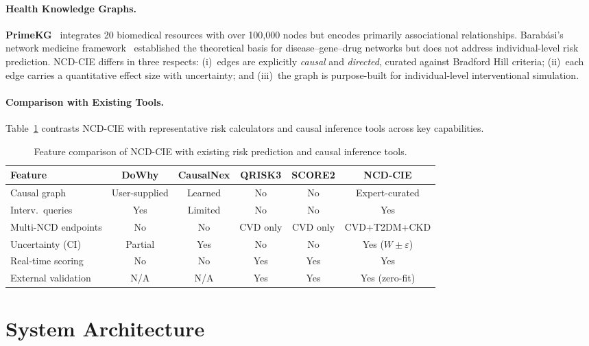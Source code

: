 \documentclass[runningheads]{llncs}
\begin{document}
\paragraph{Health Knowledge Graphs.}
\textbf{PrimeKG}~\cite{chandak2023primekg} integrates 20 biomedical
resources with over 100{,}000 nodes but encodes primarily
associational relationships.  Barab\'{a}si's network medicine
framework~\cite{barabasi2011network} established the theoretical
basis for disease--gene--drug networks but does not address
individual-level risk prediction.  NCD-CIE differs in three respects:
(i)~edges are explicitly \emph{causal} and \emph{directed}, curated
against Bradford Hill criteria; (ii)~each edge carries a quantitative
effect size with uncertainty; and (iii)~the graph is purpose-built for
individual-level interventional simulation.

\paragraph{Comparison with Existing Tools.}
Table~\ref{tab:toolcomp} contrasts NCD-CIE with representative risk
calculators and causal inference tools across key capabilities.

\begin{table}[t]
\centering
\caption{Feature comparison of NCD-CIE with existing risk prediction
and causal inference tools.}\label{tab:toolcomp}
\small
\begin{tabular}{@{}lccccc@{}}
\toprule
\textbf{Feature} & \textbf{DoWhy} & \textbf{CausalNex} &
\textbf{QRISK3} & \textbf{SCORE2} & \textbf{NCD-CIE} \\
\midrule
Causal graph        & User-supplied & Learned & No  & No  & Expert-curated \\
Interv.\ queries    & Yes & Limited & No  & No  & Yes \\
Multi-NCD endpoints & No  & No      & CVD only & CVD only & CVD+T2DM+CKD \\
Uncertainty (CI)    & Partial & Yes & No  & No  & Yes ($W\!\pm\!\varepsilon$) \\
Real-time scoring   & No  & No      & Yes & Yes & Yes \\
External validation & N/A & N/A     & Yes & Yes & Yes (zero-fit) \\
\bottomrule
\end{tabular}
\end{table}

\section{System Architecture}\label{sec:arch}
\end{document}
